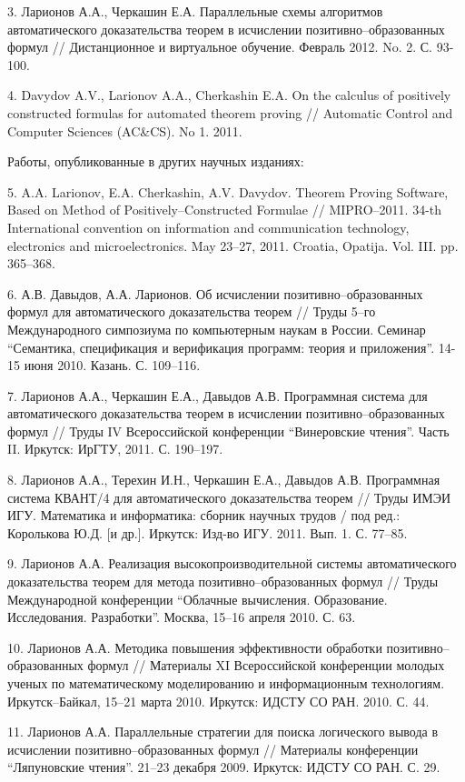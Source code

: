 \documentclass[a4paper]{report}
\begin{document}
3. Ларионов А.А., Черкашин Е.А. Параллельные схемы алгоритмов
автоматического доказательства теорем в исчислении
позитивно--образованных формул // Дистанционное и виртуальное
обучение. Февраль 2012. No. 2. С. 93-100.

4. Davydov A.V., Larionov A.A., Cherkashin E.A. On the calculus of
positively constructed formulas for automated theorem proving //
Automatic Control and Computer Sciences (AC\&CS). No 1. 2011.

Работы, опубликованные в других научных изданиях:

5. A.A. Larionov, E.A. Cherkashin, A.V. Davydov. Theorem Proving
Software, Based on Method of Positively--Constructed Formulae // MIPRO--2011. 34-th International convention on information and communication
technology, electronics and microelectronics. May 23--27,
2011. Croatia, Opatija. Vol. III. pp. 365--368.

6. А.В. Давыдов, А.А. Ларионов. Об исчислении позитивно--образованных
формул для автоматического доказательства теорем // Труды 5--го
Международного симпозиума по компьютерным наукам в России. Семинар
``Семантика, спецификация и верификация программ: теория и приложения''. 14-15 июня 2010. Казань. С. 109--116.

7. Ларионов А.А., Черкашин Е.А., Давыдов А.В. Программная система для
автоматического доказательства теорем в исчислении
позитивно--образованных формул // Труды IV
Всероссийской конференции ``Винеровские чтения''. Часть II. Иркутск: ИрГТУ, 2011. С. 190--197.

8. Ларионов А.А., Терехин И.Н., Черкашин Е.А., Давыдов А.В.
Программная система КВАНТ/4 для автоматического доказательства теорем
// Труды ИМЭИ ИГУ. Математика и информатика: сборник научных трудов / под ред.: Королькова Ю.Д. [и др.]. Иркутск: Изд-во ИГУ. 2011. Вып. 1. С. 77--85.

9. Ларионов А.А. Реализация высокопроизводительной системы
автоматического доказательства теорем для метода
позитивно--образованных формул // Труды Международной конференции
``Облачные вычисления. Образование. Исследования. Разработки''. Москва,
15--16 апреля 2010. С. 63.

10. Ларионов А.А. Методика повышения эффективности обработки
позитивно--образованных формул // Материалы XI Всероссийской
конференции молодых ученых по математическому моделированию и
информационным технологиям. Иркутск--Байкал, 15--21 марта 2010. Иркутск: ИДСТУ СО РАН. 2010. С. 44.

11. Ларионов А.А. Параллельные стратегии для поиска логического вывода
в исчислении позитивно--образованных формул // Материалы конференции
``Ляпуновские чтения''. 21--23 декабря 2009. Иркутск: ИДСТУ СО РАН. С. 29.
\end{document}
